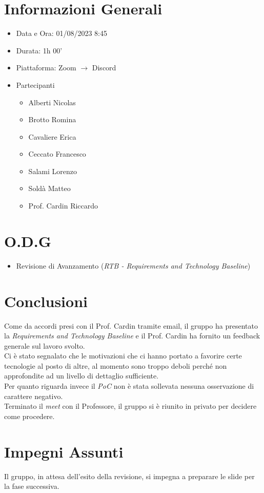 \documentclass[a4paper, 12pt]{article}
\begin{document}
\makefrontpage
\section*{Informazioni Generali}
\begin{itemize}
    \item Data e Ora: 01/08/2023 8:45
    \item Durata: 1h 00'
    \item Piattaforma: Zoom $\rightarrow$ Discord
    \item Partecipanti
    \begin{itemize}
        \item Alberti Nicolas
        \item Brotto Romina
        \item Cavaliere Erica
        \item Ceccato Francesco
        \item Salami Lorenzo
        \item Soldà Matteo
        \item Prof. Cardin Riccardo
    \end{itemize}
\end{itemize}
\section*{O.D.G}
\begin{itemize}
    \item Revisione di Avanzamento (\textit{RTB - Requirements and Technology Baseline})
\end{itemize}
\section*{Conclusioni}
Come da accordi presi con il Prof. Cardin tramite email, il gruppo ha presentato la \textit{Requirements and Technology Baseline} e il Prof. Cardin ha fornito un feedback generale sul lavoro svolto.\\
Ci è stato segnalato che le motivazioni che ci hanno portato a favorire certe tecnologie al posto di altre, al momento sono troppo deboli perché non approfondite ad un livello di dettaglio sufficiente.\\
Per quanto riguarda invece il \textit{PoC} non è stata sollevata nessuna osservazione di carattere negativo.\\
Terminato il \textit{meet} con il Professore, il gruppo si è riunito in privato per decidere come procedere.

\section*{Impegni Assunti}
Il gruppo, in attesa dell'esito della revisione, si impegna a preparare le slide per la fase successiva.
\end{document}
